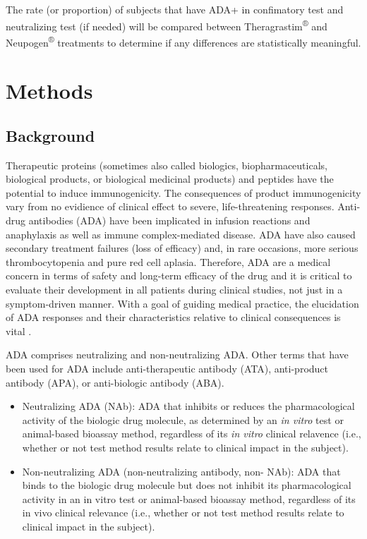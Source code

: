 \documentclass[]{book}
\providecommand{\tightlist}{%
  \setlength{\itemsep}{0pt}\setlength{\parskip}{0pt}}
\begin{document}
The rate (or proportion) of subjects that have ADA+ in confimatory test
and neutralizing test (if needed) will be compared between
Theragrastim\textsuperscript{®} and Neupogen\textsuperscript{®}
treatments to determine if any differences are statistically meaningful.

\chapter{Methods}\label{methods}

\section{Background}\label{background}

Therapeutic proteins (sometimes also called biologics,
biopharmaceuticals, biological products, or biological medicinal
products) and peptides have the potential to induce immunogenicity. The
consequences of product immunogenicity vary from no evidience of
clinical effect to severe, life-threatening responses. Anti-drug
antibodies (ADA) have been implicated in infusion reactions and
anaphylaxis as well as immune complex-mediated disease. ADA have also
caused secondary treatment failures (loss of efficacy) and, in rare
occasions, more serious thrombocytopenia and pure red cell aplasia.
Therefore, ADA are a medical concern in terms of safety and long-term
efficacy of the drug and it is critical to evaluate their development in
all patients during clinical studies, not just in a symptom-driven
manner. With a goal of guiding medical practice, the elucidation of ADA
responses and their characteristics relative to clinical consequences is
vital \citep{shankar2014assessment}.

ADA comprises neutralizing and non-neutralizing ADA. Other terms that
have been used for ADA include anti-therapeutic antibody (ATA),
anti-product antibody (APA), or anti-biologic antibody (ABA).

\begin{itemize}
\tightlist
\item
  Neutralizing ADA (NAb): ADA that inhibits or reduces the
  pharmacological activity of the biologic drug molecule, as determined
  by an \emph{in vitro} test or animal-based bioassay method, regardless
  of its \emph{in vitro} clinical relavence (i.e., whether or not test
  method results relate to clinical impact in the subject).
\item
  Non-neutralizing ADA (non-neutralizing antibody, non- NAb): ADA that
  binds to the biologic drug molecule but does not inhibit its
  pharmacological activity in an in vitro test or animal-based bioassay
  method, regardless of its in vivo clinical relevance (i.e., whether or
  not test method results relate to clinical impact in the subject).
\end{itemize}
\end{document}
